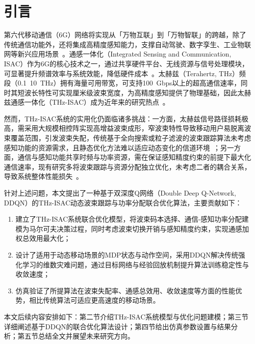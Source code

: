 \documentclass[twoside, 10pt]{ctexart}
\begin{document}
\twocolumn

\allowdisplaybreaks

\setlength{\textfloatsep}{1em} %

\section{引言}
第六代移动通信（6G）网络将实现从「万物互联」到「万物智联」的跨越，除了传统通信功能外，还将集成高精度感知能力，支撑自动驾驶、数字孪生、工业物联网等新兴应用场景~\cite{ref1}。通感一体化（Integrated Sensing and Communication, ISAC）作为6G的核心技术之一，通过共享硬件平台、无线资源与信号处理模块，可显著提升频谱效率与系统效能，降低硬件成本~\cite{ref2}。太赫兹（Terahertz, THz）频段（0.1~10~THz）拥有海量可用带宽，可支持100~Gbps以上的超高通信速率，同时其短波长特性可实现厘米级波束宽度，为高精度感知提供了物理基础，因此太赫兹通感一体化（THz-ISAC）成为近年来的研究热点~\cite{ref3}。

然而，THz-ISAC系统的实用化仍面临诸多挑战：一方面，太赫兹信号路径损耗极高，需采用大规模相控阵实现高增益波束成形，窄波束特性导致移动用户易脱离波束覆盖范围，引发波束失配，传统基于全向搜索或粒子滤波的波束跟踪算法未考虑感知功能的资源需求，且静态优化方法难以适应动态变化的信道环境~\cite{ref4}；另一方面，通信与感知功能共享时频与功率资源，需在保证感知精度约束的前提下最大化通信速率，现有研究多将波束跟踪与资源分配独立优化，未考虑二者的耦合关系，导致系统整体性能损失~\cite{ref5}。

针对上述问题，本文提出了一种基于双深度Q网络（Double Deep Q-Network, DDQN）的THz-ISAC动态波束跟踪与功率分配联合优化算法，主要贡献如下：
\begin{enumerate}
\item 建立了THz-ISAC系统联合优化模型，将波束码本选择、通信-感知功率分配建模为马尔可夫决策过程，同时考虑波束切换开销与感知精度约束，实现通感加权总效用最大化；
\item 设计了适用于动态移动场景的MDP状态与动作空间，采用DDQN解决传统强化学习的维数灾难问题，通过目标网络与经验回放机制提升算法训练稳定性与收敛速度；
\item 仿真验证了所提算法在波束失配率、通感总效用、收敛速度等方面的性能优势，相比传统算法可适应更高速度的移动场景。
\end{enumerate}

本文后续内容安排如下：第二节介绍THz-ISAC系统模型与优化问题建模；第三节详细阐述基于DDQN的联合优化算法设计；第四节给出仿真参数设置与结果分析；第五节总结全文并展望未来研究方向。

\end{document}
